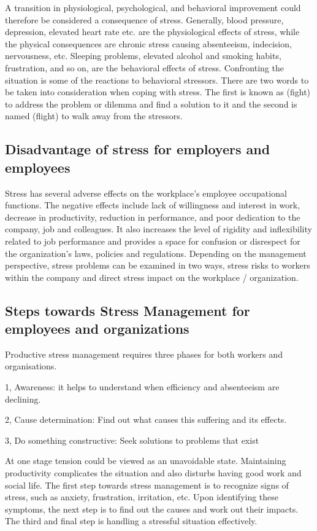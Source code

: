 A transition in physiological, psychological, and behavioral improvement could therefore be considered a consequence of stress.  Generally, blood pressure, depression, elevated heart rate etc. are the physiological effects of stress, while the physical consequences are chronic stress causing absenteeism, indecision, nervousness, etc. Sleeping problems, elevated alcohol and smoking habits, frustration, and so on, are the behavioral effects of stress. Confronting the situation is some of the reactions to behavioral stressors. There are two words to be taken into consideration when coping with stress. The first is known as (fight) to address the problem or dilemma and find a solution to it and the second is named (flight) to walk away from the stressors. \citep[p.348]{Parker2008PersonalityProcess}
\subsection{Disadvantage of stress for employers and employees}
Stress has several adverse effects on the workplace's employee occupational functions. The negative effects include lack of willingness and interest in work, decrease in productivity, reduction in performance, and poor dedication to the company, job and colleagues.  It also increases the level of rigidity and inflexibility related to job performance and provides a space for confusion or disrespect for the organization's laws, policies and regulations. \citep[p.10]{Fairbrother2003WorkplaceSatisfaction} Depending on the management perspective, stress problems can be examined in two ways, stress risks to workers within the company and direct stress impact on the workplace / organization. 

\subsection{Steps towards Stress Management for employees and organizations}
Productive stress management requires three phases for both workers and organisations. 

1, Awareness: it helps to understand when efficiency and absenteeism are declining.

2, Cause determination: Find out what causes this suffering and its effects.

3, Do something constructive: Seek solutions to problems that exist

At one stage tension could be viewed as an unavoidable state. Maintaining productivity complicates the situation and also disturbs having good work and social life. The first step towards stress management is to recognize signs of stress, such as anxiety, frustration, irritation, etc. Upon identifying these symptoms, the next step is to find out the causes and work out their impacts. The third and final step is handling a stressful situation effectively.

